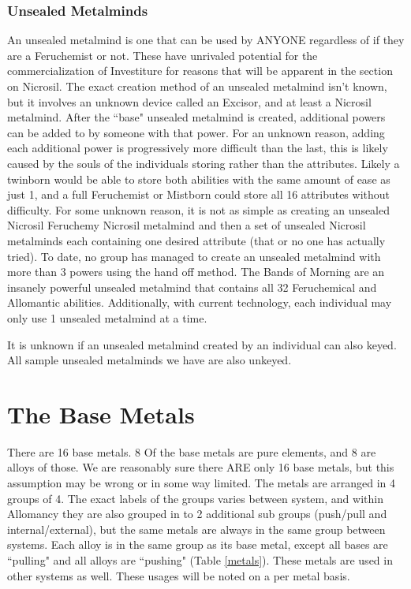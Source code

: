 \documentclass[conference]{IEEEtran}
\begin{document}
\subsubsection*{Unsealed Metalminds}\hfill\break
An unsealed metalmind is one that can be used by ANYONE regardless of if they are a Feruchemist or not.\cite{unsealed}  These have unrivaled potential for the commercialization of Investiture for reasons that will be apparent in the section on Nicrosil.  The exact creation method of an unsealed metalmind isn't known, but it involves an unknown device called an Excisor, and at least a Nicrosil metalmind.\cite{BoM-CH21}  After the ``base" unsealed metalmind is created, additional powers can be added to by someone with that power.  For an unknown reason, adding each additional power is progressively more difficult than the last, this is likely caused by the souls of the individuals storing rather than the attributes.  Likely a twinborn would be able to store both abilities with the same amount of ease as just 1,\cite{BoM-CH21} and a full Feruchemist or Mistborn could store all 16 attributes without difficulty.\cite{BoM-CH28}  For some unknown reason, it is not as simple as creating an unsealed Nicrosil Feruchemy Nicrosil metalmind and then a set of unsealed Nicrosil metalminds each containing one desired attribute (that or no one has actually tried).  To date, no group has managed to create an unsealed metalmind with more than 3 powers using the hand off method.  The Bands of Morning are an insanely powerful unsealed metalmind that contains all 32 Feruchemical and Allomantic abilities.  Additionally, with current technology, each individual may only use 1 unsealed metalmind at a time.\cite{BoM-CH21}

It is unknown if an unsealed metalmind created by an individual can also keyed.  All sample unsealed metalminds we have are also unkeyed.

\hfill
\section*{The Base Metals}
There are 16 base metals.\cite{WoF} 8 Of the base metals are pure elements, and 8 are alloys of those.\cite{TFE-CH7}  We are reasonably sure there ARE only 16 base metals, but this assumption may be wrong or in some way limited.\cite{HoA-CH70}\cite{base16} The metals are arranged in 4 groups of 4.\cite{AL-TB}  The exact labels of the groups varies between system,\cite{FE-TB}\cite{HE-TB} and within Allomancy they are also grouped in to 2 additional sub groups (push/pull and internal/external),\cite{ARS} but the same metals are always in the same group between systems.\cite{FE-TB}\cite{HE-TB}  Each alloy is in the same group as its base metal,\cite{AL-TB} except all bases are ``pulling" and all alloys are ``pushing"\cite{ARS} (Table \ref{metals}).
These metals are used in other systems as well.  These usages will be noted on a per metal basis.
\end{document}
